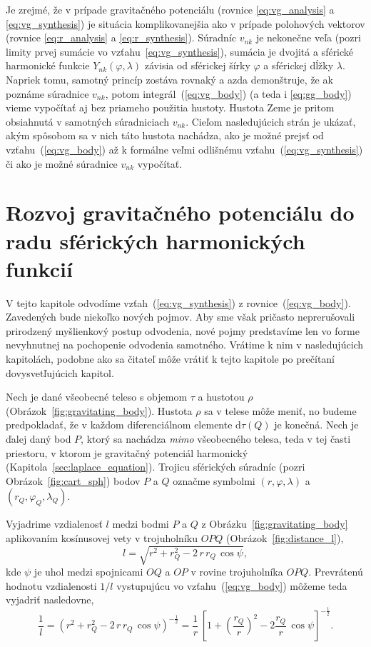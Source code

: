 \documentclass[a4paper, 12pt]{book}
\newcommand{\diff}{\mathrm d}
\begin{document}
Je zrejmé, že v prípade gravitačného potenciálu (rovnice \ref{eq:vg_analysis} 
a \ref{eq:vg_synthesis}) je situácia komplikovanejšia ako v prípade polohových 
vektorov (rovnice \ref{eq:r_analysis} a \ref{eq:r_synthesis}).  Súradníc 
$v_{nk}$ je nekonečne veľa (pozri limity prvej sumácie vo 
vzťahu~\ref{eq:vg_synthesis}), sumácia je dvojitá a sférické harmonické funkcie 
$Y_{nk}(\varphi, \lambda)$ závisia od sférickej šírky $\varphi$ a sférickej 
dĺžky $\lambda$.  Napriek tomu, samotný princíp zostáva rovnaký a azda 
demonštruje, že ak poznáme súradnice $v_{nk}$, potom 
integrál~(\ref{eq:vg_body}) (a teda i \ref{eq:gg_body}) vieme vypočítať aj bez 
priameho použitia hustoty.  Hustota Zeme je pritom obsiahnutá v samotných 
súradniciach $v_{nk}$.  Cieľom nasledujúcich strán je ukázať, akým spôsobom sa 
v nich táto hustota nachádza, ako je možné prejsť od vzťahu~(\ref{eq:vg_body}) 
až k formálne veľmi odlišnému vzťahu~(\ref{eq:vg_synthesis}) či ako je možné 
súradnice $v_{nk}$ vypočítať.



\section{Rozvoj gravitačného potenciálu do radu sférických harmonických 
funkcií}
\label{sec:vg_sh_expansion}

V tejto kapitole odvodíme vzťah~(\ref{eq:vg_synthesis}) 
z rovnice~(\ref{eq:vg_body}).  Zavedených bude niekoľko nových pojmov.  Aby sme 
však pričasto neprerušovali prirodzený myšlienkový postup odvodenia, nové pojmy 
predstavíme len vo forme nevyhnutnej na pochopenie odvodenia samotného.  
Vrátime k nim v nasledujúcich kapitolách, podobne ako sa čitateľ môže vrátiť 
k tejto kapitole po prečítaní dovysvetľujúcich kapitol.

Nech je dané všeobecné teleso s objemom $\tau$ a hustotou $\rho$ 
(Obrázok~\ref{fig:gravitating_body}).  Hustota $\rho$ sa v telese môže meniť, 
no budeme predpokladať, že v každom diferenciálnom elemente $\diff \tau(Q)$ je 
konečná.  Nech je ďalej daný bod $P$, ktorý sa nachádza \emph{mimo} všeobecného 
telesa, teda v tej časti priestoru, v ktorom je gravitačný potenciál harmonický 
(Kapitola~\ref{sec:laplace_equation}).  Trojicu sférických súradníc (pozri 
Obrázok~\ref{fig:cart_sph}) bodov $P$ a $Q$ označme symbolmi $(r, \varphi, 
\lambda)$ a $(r_Q, \varphi_Q, \lambda_Q)$.

Vyjadrime vzdialenosť $l$ medzi bodmi $P$ a $Q$ 
z Obrázku~\ref{fig:gravitating_body} aplikovaním kosínusovej vety 
v trojuholníku $OPQ$ (Obrázok~\ref{fig:distance_l}),
%
\begin{equation}
l = \sqrt{r^2 + r_Q^2 - 2 \, r \, r_Q \, \cos\psi}{,}
\end{equation}
%
kde $\psi$ je uhol medzi spojnicami $OQ$ a $OP$ v rovine trojuholníka $OPQ$.  
Prevrátenú hodnotu vzdialenosti $1 \slash l$ vystupujúcu vo 
vzťahu~(\ref{eq:vg_body}) môžeme teda vyjadriť nasledovne,
%
\begin{equation}
\label{eq:1l}
\frac{1}{l} = \left( r^2 + r_Q^2 - 2 \, r \, r_Q \, \cos\psi 
\right)^{-\frac{1}{2}} = \frac{1}{r} \, \left[1 + \left( \dfrac{r_Q}{r} 
\right)^2 - 2 \dfrac{r_Q}{r} \, \cos\psi \right]^{-\frac{1}{2}}{.}
\end{equation}
\end{document}
